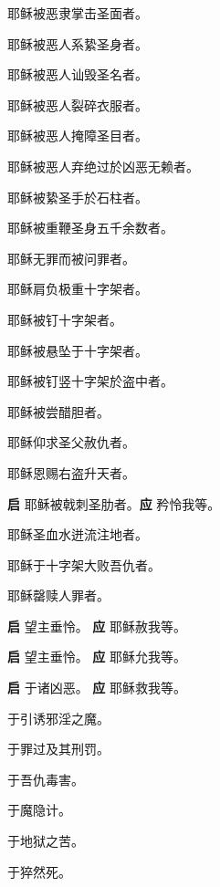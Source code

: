 \documentclass[UTF8,17pt]{ctexart}
\begin{document}
 耶稣被恶⾪掌击圣⾯者。

 耶稣被恶⼈系絷圣⾝者。

 耶稣被恶⼈讪毁圣名者。

 耶稣被恶⼈裂碎⾐服者。

 耶稣被恶⼈掩障圣⽬者。

 耶稣被恶⼈弃绝过於凶恶⽆赖者。

 耶稣被絷圣⼿於⽯柱者。

 耶稣被重鞭圣⾝五千余数者。

 耶稣⽆罪⽽被问罪者。

 耶稣肩负极重⼗字架者。

 耶稣被钉⼗字架者。

 耶稣被悬坠于⼗字架者。

 耶稣被钉竖⼗字架於盗中者。

 耶稣被尝醋胆者。

 耶稣仰求圣⽗赦仇者。

 耶稣恩赐右盗升天者。

\textbf{启} \quad 耶稣被戟刺圣肋者。\hfill \textbf{应} \quad 矜怜我等。

 耶稣圣⾎⽔迸流注地者。

 耶稣于⼗字架⼤败吾仇者。

 耶稣罄赎⼈罪者。

\textbf{启} \quad 望主垂怜。 \hfill \textbf{应} \quad 耶稣赦我等。

\textbf{启} \quad 望主垂怜。 \hfill \textbf{应} \quad 耶稣允我等。

\textbf{启} \quad 于诸凶恶。 \hfill \textbf{应} \quad 耶稣救我等。

 于引诱邪淫之魔。

 于罪过及其刑罚。

 于吾仇毒害。

 于魔隐计。

 于地狱之苦。

 于猝然死。
\end{document}
